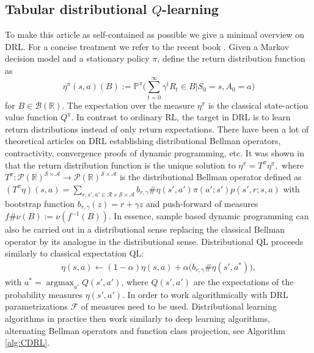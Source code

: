 \documentclass{article}
\theoremstyle{plain}
\theoremstyle{definition}
\theoremstyle{remark}
\begin{document}
\subsection{Tabular distributional $Q$-learning}
To make this article as self-contained as possible we give a minimal  overview on DRL. For a concise treatment we refer to the recent book \cite{drl}. Given a Markov decision model and a stationary policy $\pi$, \cite{rowland18} define the return distribution function as
\[ \eta^{\pi}(s,a)(B):=\mathbb P^{\pi}\Big(\sum_{t=0}^{\infty}\gamma^{t}R_{t}\in B \Big|S_0=s, A_0=a\Big)\]
for $B\in \mathcal B(\mathbb R)$. The expectation over the measure $\eta^\pi$ is the classical state-action value function $Q^\pi$. In contrast to ordinary RL, the target in DRL  is to learn return distributions instead of only return expectations. There have been a lot of theoretical articles on DRL \cite{bellemare2017,dabney2018,rowland18,lyle19,drl,rowland2023,rowland2023analysis} establishing distributional Bellman operators, contractivity, convergence proofs of dynamic programming, etc. It was shown in \cite{bellemare2017,drl} that the return distribution function is the unique solution to $\eta^\pi=T^\pi\eta^\pi,$ where $T^\pi:\mathcal P(\mathbb R)^{\mathcal S\times\mathcal A}\to\mathcal P(\mathbb R)^{\mathcal S\times\mathcal A}$ is the distributional Bellman operator defined as $(T^\pi\eta)(s,a)=\sum_{r,s',a'\in\mathcal R\times\mathcal S\times\mathcal A}b_{r,\gamma}\#\eta(s',a')\pi(a';s')p(s',r;s,a)$ with bootstrap function $b_{r,\gamma}(z)= r+\gamma z$ and  push-forward of measures $f\#\nu(B):=\nu(f^{-1}(B))$. In essence, sample based dynamic programming can also be carried out in a distributional sense replacing the classical Bellman operator by its analogue in the distributional sense. Distributional QL proceeds similarly to classical expectation QL:
\begin{align*}
    \eta(s,a)\leftarrow (1-\alpha) \eta(s,a)+\alpha\big(b_{r,\gamma}\#\eta(s',a^*)\big),
\end{align*}
with $a^*=\operatorname{argmax}_{a'}Q(s',a')$, where $Q(s',a')$ are the expectations of the probability measures $\eta(s',a')$. In order to work algorithmically with DRL parametrizations $\mathcal F$ of measures need to be used. Distributional learning algorithms in practice then work similarly to deep learning algorithms, alternating Bellman operators and function class projection, see Algorithm \ref{alg:CDRL}. 
\end{document}
